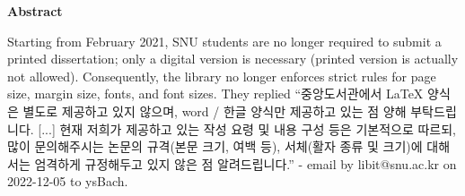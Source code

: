 \documentclass[12pt]{report}
\makeatletter
\renewcommand{\abstractname}{\large Abstract}
\renewenvironment{abstract}{%
    \if@twocolumn
    \section*{\abstractname}%
    \else
    \small
    \begin{center}%
        {\bfseries \abstractname\vspace{-.5em}\vspace{\z@}}%
    \end{center}%
    \quotation
    \fi}
{\if@twocolumn\else\endquotation\fi}
\renewenvironment{abstract}
 {\small
  \begin{center}
  \bfseries \abstractname\vspace{-.5em}\vspace{0pt}
  \end{center}
  \list{}{%
    \setlength{\leftmargin}{10mm}%
    \setlength{\rightmargin}{\leftmargin}%
  }%
  \item\relax}
 {\endlist}
\makeatother
\begin{document}
\lstset{style=python}




\begin{abstract}
Starting from February 2021, SNU students are no longer required to submit a printed dissertation; only a digital version is necessary (printed version is actually not allowed). Consequently, the library no longer enforces strict rules for page size, margin size, fonts, and font sizes. They replied ``{\footnotesize 중앙도서관에서 LaTeX 양식은 별도로 제공하고 있지 않으며, word / 한글 양식만 제공하고 있는 점 양해 부탁드립니다. [...] 현재 저희가 제공하고 있는 작성 요령 및 내용 구성 등은 기본적으로 따르되, 많이 문의해주시는 논문의 규격(본문 크기, 여백 등), 서체(활자 종류 및 크기)에 대해서는 엄격하게 규정해두고 있지 않은 점 알려드립니다.}'' - email by libit@snu.ac.kr on 2022-12-05 to ysBach.


\end{abstract}
\end{document}
